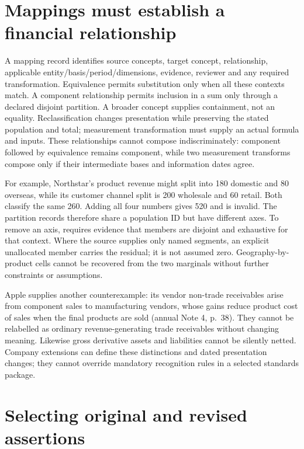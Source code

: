 \section{Mappings must establish a financial relationship}

A mapping record identifies source concepts, target concept, relationship,
applicable entity/basis/period/dimensions, evidence, reviewer and any required
transformation. Equivalence permits substitution only when all these contexts
match. A component relationship permits inclusion in a sum only through a
declared disjoint partition. A broader concept supplies containment, not an
equality. Reclassification changes presentation while preserving the stated
population and total; measurement transformation must supply an actual formula
and inputs. These relationships cannot compose indiscriminately: component
followed by equivalence remains component, while two measurement transforms
compose only if their intermediate bases and information dates agree.

For example, Northstar's product revenue might split into 180 domestic and
80 overseas, while its customer channel split is 200 wholesale and 60 retail.
Both classify the same 260. Adding all four numbers gives 520 and is invalid.
The partition records therefore share a population ID but have different axes.
To remove an axis,  requires evidence that members are disjoint
and exhaustive for that context. Where the source supplies only named
segments, an explicit unallocated member carries the residual; it is not
assumed zero. Geography-by-product cells cannot be recovered from the two
marginals without further constraints or assumptions.

Apple supplies another counterexample: its vendor non-trade receivables arise
from component sales to manufacturing vendors, whose gains reduce product
cost of sales when the final products are sold (annual Note 4, p.~38).
They cannot be relabelled as ordinary revenue-generating trade receivables
without changing meaning. Likewise gross derivative assets and liabilities
cannot be silently netted. Company extensions can define these distinctions
and dated presentation changes; they cannot override mandatory recognition
rules in a selected standards package.

\section{Selecting original and revised assertions}
\enlargethispage{2\baselineskip}

